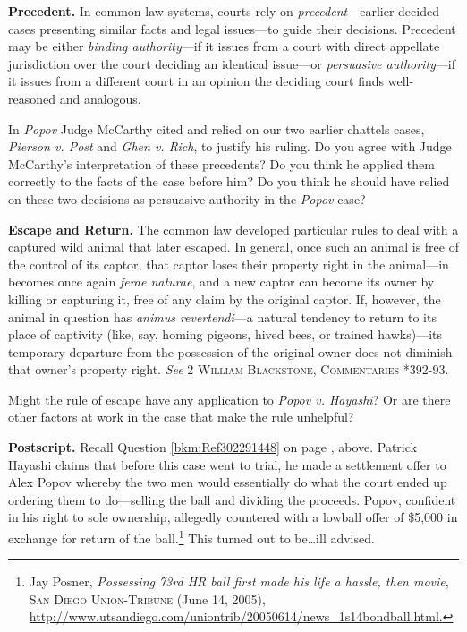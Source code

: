 \item \label{bkm:Ref302292617}\textbf{Precedent.} {}In common-law systems,
courts rely on \textit{precedent}---earlier decided cases presenting similar
facts and legal issues---to guide their decisions. Precedent may be either
\textit{binding authority}---if it issues from a court with direct appellate
jurisdiction over the court deciding an identical issue---or \textit{persuasive
authority}---if it issues from a different court in an opinion the deciding
court finds well-reasoned and analogous. 

In \textit{Popov} Judge McCarthy cited and relied on our two earlier chattels
cases, \textit{Pierson v. Post} and \textit{Ghen v. Rich}, to justify his
ruling. Do you agree with Judge McCarthy's interpretation of these precedents?
Do you think he applied them correctly to the facts of the case before him? Do
you think he should have relied on these two decisions as persuasive authority
in the \textit{Popov} case?


\item \textbf{Escape and Return.} The common law developed particular rules to
deal with a captured wild animal that later escaped. In general, once such an
animal is free of the control of its captor, that captor loses their property
right in the animal---in becomes once again \textit{ferae naturae}, and a new
captor can become its owner by killing or capturing it, free of any claim by the
original captor. If, however, the animal in question has \textit{animus
revertendi}---a natural tendency to return to its place of captivity (like, say,
homing pigeons, hived bees, or trained hawks)---its temporary departure from the
possession of the original owner does not diminish that owner's property right.
\textit{See} 2 \textsc{William Blackstone, Commentaries} *392-93.

Might the rule of escape have any application to \textit{Popov v. Hayashi}? Or
are there other factors at work in the case that make the rule unhelpful?


\item \textbf{Postscript.} Recall Question \ref{bkm:Ref302291448} on page
\pageref{bkm:Ref302291448}, above. Patrick Hayashi claims that before this case
went to trial, he made a settlement offer to Alex Popov whereby the two men
would essentially do what the court ended up ordering them to do---selling the
ball and dividing the proceeds. Popov, confident in his right to sole ownership,
allegedly countered with a lowball offer of \$5,000 in exchange for return of
the ball.\footnote{Jay Posner, \textit{Possessing 73rd HR ball first made his
life a hassle, then movie}, \textsc{San Diego Union-Tribune} (June 14, 2005),
\url{http://www.utsandiego.com/uniontrib/20050614/news\_1s14bondball.html.}}
This turned out to be\ldots ill advised.

